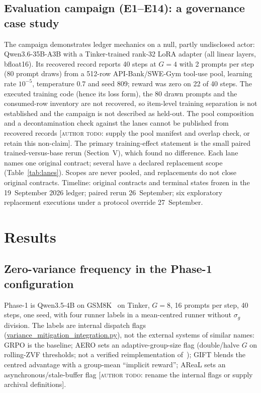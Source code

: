\documentclass[conference]{IEEEtran}
\newcommand{\authortodo}[1]{[\textsc{author todo}: #1]}
\begin{document}
\subsection{Evaluation campaign (E1--E14): a governance case study}
The campaign demonstrates ledger mechanics on a null, partly undisclosed
actor: Qwen3.6-35B-A3B with a Tinker-trained rank-32 LoRA adapter (all
linear layers, bfloat16). Its recovered record reports 40 steps at $G=4$
with 2 prompts per step (80 prompt draws) from a 512-row API-Bank/SWE-Gym
tool-use pool, learning rate $10^{-5}$, temperature 0.7 and seed 809;
reward was zero on 22 of 40 steps. The executed training code (hence its
loss form), the 80 drawn prompts and the consumed-row inventory are not
recovered, so item-level training separation is not established and the
campaign is not described as held-out. The pool composition and a
decontamination check against the lanes cannot be published from recovered
records \authortodo{supply the pool manifest and overlap check, or retain
this non-claim}. The primary training-effect statement is the small paired
trained-versus-base rerun (Section~V), which found no difference. Each lane
names one original contract; several have a declared replacement scope
(Table~\ref{tab:lanes}). Scopes are never pooled, and replacements do not
close original contracts. Timeline: original contracts and terminal states
frozen in the 19~September 2026 ledger; paired rerun 26~September; six
exploratory replacement executions under a protocol override 27~September.

\section{Results}

\subsection{Zero-variance frequency in the Phase-1 configuration}
Phase-1 is Qwen3.5-4B on GSM8K~\cite{cobbe2021training} on Tinker, $G=8$, 16
prompts per step, 40 steps, one seed, with four runner labels in a
mean-centred runner without $\sigma_g$ division. The labels are internal
dispatch flags (\url{variance_mitigation_integration.py}), not the
external systems of similar names: GRPO is the baseline; AERO sets an
adaptive-group-size flag (double/halve $G$ on rolling-ZVF thresholds; not a
verified reimplementation of~\cite{zhang2026aero}); GIFT blends the centred
advantage with a group-mean ``implicit reward''; AReaL sets an
asynchronous/stale-buffer flag \authortodo{rename the internal flags or
supply archival definitions}.
\end{document}
